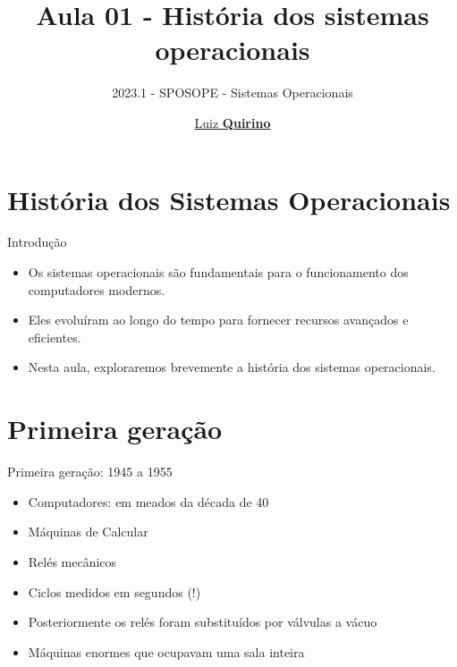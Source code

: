 \documentclass{beamer}
\title{Aula 01 - História dos sistemas operacionais}
\subtitle{2023.1 - SPOSOPE - Sistemas Operacionais}
\author{\href{mailto:luizfpq@gmail.com}{Luiz \textbf{Quirino}}}
\newcommand{\hrefcol}[2]{\textcolor{cyan}{\href{#1}{#2}}}
\begin{document}
\maketitle

%
%




\section{História dos Sistemas Operacionais}

\begin{frame}{Introdução}
      \begin{itemize}
            \item Os sistemas operacionais são fundamentais para o funcionamento dos computadores modernos.
            \item Eles evoluíram ao longo do tempo para fornecer recursos avançados e eficientes.
            \item Nesta aula, exploraremos brevemente a história dos sistemas operacionais.
          \end{itemize}

\end{frame}


\section{Primeira geração}
\begin{frame}{Primeira geração: 1945 a 1955}
      \begin{itemize}
          \item Computadores: em meados da década de 40
          \item Máquinas de Calcular
          \item Relés mecânicos
          \item Ciclos medidos em segundos (!)
          \item Posteriormente os relés foram substituídos por válvulas a vácuo
          \item Máquinas enormes que ocupavam uma sala inteira
      \end{itemize}
  \end{frame}
\end{document}
